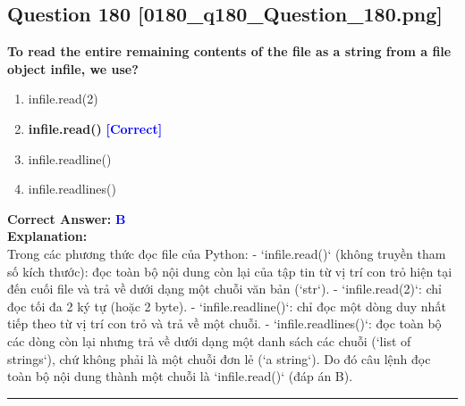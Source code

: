 \documentclass[11pt,a4paper]{article}
\begin{document}
\begin{minipage}{\textwidth}
\subsection*{Question 180 \quad \footnotesize{[0180_q180_Question_180.png]}}
\noindent \textbf{To read the entire remaining contents of the file as a string from a file object infile, we use?}

\begin{enumerate}[label=\Alph*.]
    \item infile.read(2)
    \item \textbf{infile.read()} \hfill \textcolor{blue}{\textbf{[Correct]}}
    \item infile.readline()
    \item infile.readlines()
\end{enumerate}

\noindent \textbf{Correct Answer:} \textcolor{blue}{\textbf{B}} \\[4pt]
\noindent \textbf{Explanation:}\\
Trong các phương thức đọc file của Python:\newline
- `infile.read()` (không truyền tham số kích thước): đọc toàn bộ nội dung còn lại của tập tin từ vị trí con trỏ hiện tại đến cuối file và trả về dưới dạng một chuỗi văn bản (`str`).\newline
- `infile.read(2)`: chỉ đọc tối đa 2 ký tự (hoặc 2 byte).\newline
- `infile.readline()`: chỉ đọc một dòng duy nhất tiếp theo từ vị trí con trỏ và trả về một chuỗi.\newline
- `infile.readlines()`: đọc toàn bộ các dòng còn lại nhưng trả về dưới dạng một danh sách các chuỗi (`list of strings`), chứ không phải là một chuỗi đơn lẻ (`a string`).\newline
Do đó câu lệnh đọc toàn bộ nội dung thành một chuỗi là `infile.read()` (đáp án B).
\end{minipage}
\vspace{0.8cm}
\hrule
\vspace{0.5cm}
\end{document}
